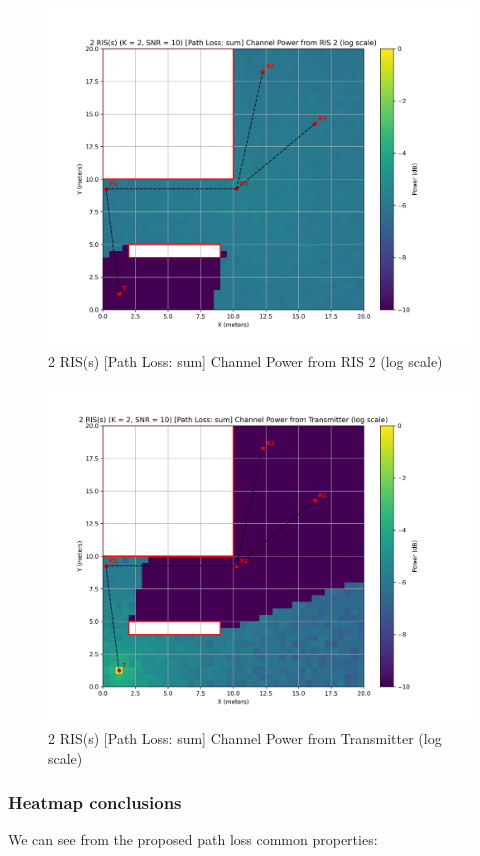 \begin{figure}[H]
  \centering
  \includegraphics[width=0.7\linewidth]{imgs/heatmap-simulations/2 RIS(s) (K = 2, SNR = 10) [Path Loss_ sum] Channel Power from RIS 2 (log scale).png}
  \caption{2 RIS(s) [Path Loss: sum] Channel Power from RIS 2 (log scale)}
\end{figure}

\begin{figure}[H]
  \centering
  \includegraphics[width=0.7\linewidth]{imgs/heatmap-simulations/2 RIS(s) (K = 2, SNR = 10) [Path Loss_ sum] Channel Power from Transmitter (log scale).png}
  \caption{2 RIS(s) [Path Loss: sum] Channel Power from Transmitter (log scale)}
\end{figure}

\subsubsection{Heatmap conclusions}

We can see from the proposed path loss common properties:

